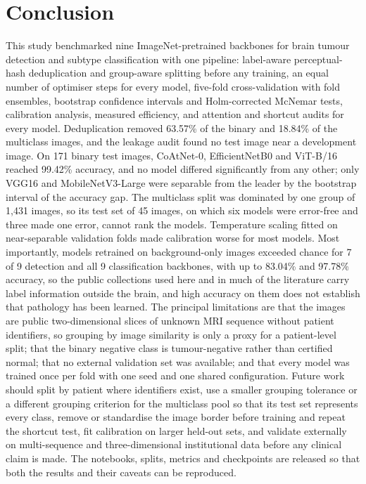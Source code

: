 \documentclass[final,3p,times,number]{elsarticle}
\begin{document}
\section{Conclusion}
\label{sec:conclusion}

This study benchmarked nine ImageNet-pretrained backbones for brain tumour detection and subtype classification with one pipeline: label-aware perceptual-hash deduplication and group-aware splitting before any training, an equal number of optimiser steps for every model, five-fold cross-validation with fold ensembles, bootstrap confidence intervals and Holm-corrected McNemar tests, calibration analysis, measured efficiency, and attention and shortcut audits for every model. Deduplication removed 63.57\% of the binary and 18.84\% of the multiclass images, and the leakage audit found no test image near a development image. On 171 binary test images, CoAtNet-0, EfficientNetB0 and ViT-B/16 reached 99.42\% accuracy, and no model differed significantly from any other; only VGG16 and MobileNetV3-Large were separable from the leader by the bootstrap interval of the accuracy gap. The multiclass split was dominated by one group of 1,431 images, so its test set of 45 images, on which six models were error-free and three made one error, cannot rank the models. Temperature scaling fitted on near-separable validation folds made calibration worse for most models. Most importantly, models retrained on background-only images exceeded chance for 7 of 9 detection and all 9 classification backbones, with up to 83.04\% and 97.78\% accuracy, so the public collections used here and in much of the literature carry label information outside the brain, and high accuracy on them does not establish that pathology has been learned. The principal limitations are that the images are public two-dimensional slices of unknown MRI sequence without patient identifiers, so grouping by image similarity is only a proxy for a patient-level split; that the binary negative class is tumour-negative rather than certified normal; that no external validation set was available; and that every model was trained once per fold with one seed and one shared configuration. Future work should split by patient where identifiers exist, use a smaller grouping tolerance or a different grouping criterion for the multiclass pool so that its test set represents every class, remove or standardise the image border before training and repeat the shortcut test, fit calibration on larger held-out sets, and validate externally on multi-sequence and three-dimensional institutional data before any clinical claim is made. The notebooks, splits, metrics and checkpoints are released so that both the results and their caveats can be reproduced.
\end{document}
